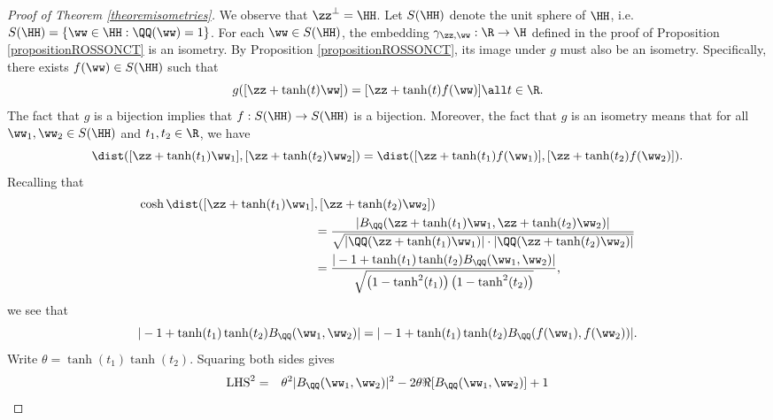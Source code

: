 \begin{proof}[Proof of Theorem \ref{theoremisometries}]
We observe that $\zz^\perp = \HH$. Let $S(\HH)$ denote the unit sphere of $\HH$, i.e. $S(\HH) = \{\ww\in\HH : \QQ(\ww) = 1\}$. For each $\ww\in S(\HH)$, the embedding $\gamma_{\zz,\ww}:\R\to\H$ defined in the proof of Proposition \ref{propositionROSSONCT} is an isometry. By Proposition \ref{propositionROSSONCT}, its image under $g$ must also be an isometry. Specifically, there exists $f(\ww)\in S(\HH)$ such that
\begin{equation}
\label{tanht}
g([\zz + \tanh(t)\ww]) = [\zz + \tanh(t)f(\ww)] \all t\in\R.
\end{equation}
The fact that $g$ is a bijection implies that $f:S(\HH)\to S(\HH)$ is a bijection. Moreover, the fact that $g$ is an isometry means that for all $\ww_1,\ww_2\in S(\HH)$ and $t_1,t_2\in\R$, we have
\[
\dist([\zz + \tanh(t_1)\ww_1], [\zz + \tanh(t_2)\ww_2]) = \dist([\zz + \tanh(t_1)f(\ww_1)], [\zz + \tanh(t_2)f(\ww_2)]).
\]
Recalling that
\begin{align*}
\cosh\dist([\zz + \tanh(t_1)\ww_1] &, [\zz + \tanh(t_2)\ww_2])\\ &= \frac{|B_\QQ(\zz + \tanh(t_1)\ww_1, \zz + \tanh(t_2)\ww_2)|}{\sqrt{|\QQ(\zz + \tanh(t_1)\ww_1)|\cdot|\QQ(\zz + \tanh(t_2)\ww_2)|}}\\
&= \frac{|-1 + \tanh(t_1)\tanh(t_2)B_\QQ(\ww_1,\ww_2)|}{\sqrt{\left(1 - \tanh^2(t_1)\right)\left(1 - \tanh^2(t_2)\right)}},
\end{align*}
we see that
\[
|-1 + \tanh(t_1)\tanh(t_2)B_\QQ(\ww_1,\ww_2)| = |-1 + \tanh(t_1)\tanh(t_2)B_\QQ(f(\ww_1),f(\ww_2))|.
\]
Write $\theta = \tanh(t_1)\tanh(t_2)$. Squaring both sides gives
\begin{eqnarray}
\label{thetapolynomial}
\mathrm{LHS}^2 & = & \theta^2 |B_\QQ(\ww_1,\ww_2)|^2 - 2\theta \Re[B_\QQ(\ww_1,\ww_2)] + 1 \nonumber \\

\end{eqnarray}
\end{proof}
